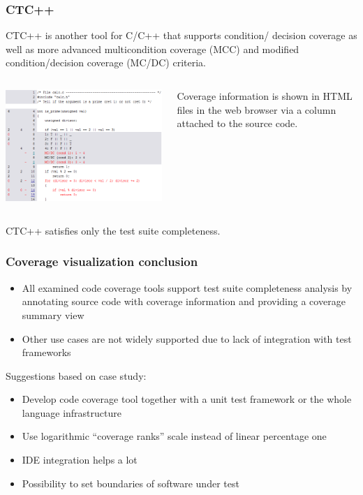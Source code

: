 \documentclass{beamer}
\begin{document}
\begin{frame}
  \frametitle{CTC++}
CTC++ is another tool for C/C++ that  supports condition/ decision coverage as well as 
more advanced multicondition coverage (MCC) and modified condition/decision coverage (MC/DC) criteria.
\begin{columns}[T]
\begin{column}{.6\textwidth}
   \hfill
    \includegraphics[scale=0.4]{ctc_source.png}
\end{column}
\begin{column}{.3\textwidth}
Coverage information is shown in HTML files in the web browser via a column attached to the source code.
\end{column}
\end{columns}
CTC++ satisfies only the test suite completeness.
\end{frame}

\begin{frame}
  \frametitle{Coverage visualization conclusion}
\begin{itemize}
  \item All examined code coverage tools support test suite completeness analysis by annotating source code with coverage information and providing a coverage summary view
  \item Other use cases are not widely supported due to lack of integration with test frameworks
\end{itemize}
Suggestions based on case study:
\begin{itemize}
  \item Develop code coverage tool together with a unit test framework or the whole language infrastructure 
  \item Use logarithmic “coverage ranks” scale instead of linear percentage one
  \item IDE integration helps a lot
  \item Possibility to set  boundaries of software under test
\end{itemize}
\end{frame}
\end{document}
